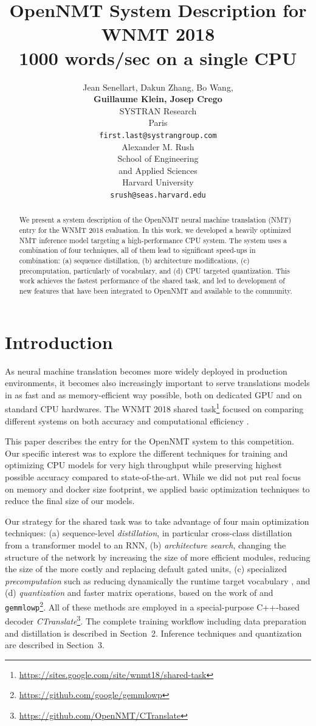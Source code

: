 \documentclass[11pt,a4paper]{article}
\title{OpenNMT System Description for WNMT 2018 \protect\\ 1000 words/sec on a single CPU}
\author{Jean Senellart, Dakun Zhang, Bo Wang,\\{\bf Guillaume Klein, Josep Crego}\\
  SYSTRAN Research\\
  Paris \\
  {\tt first.last@systrangroup.com} \\\And
  Alexander M. Rush\\
  School of Engineering \\
  and Applied Sciences \\
  Harvard University \\
  {\tt srush@seas.harvard.edu} \\}
\date{}
\begin{document}
\maketitle
\begin{abstract}

  We present a system description of the OpenNMT neural machine translation (NMT) entry for the WNMT 2018 evaluation.
  In this work, we developed a heavily optimized NMT inference model
  targeting a high-performance CPU system. The system uses a
  combination of four techniques, all of them lead to significant
  speed-ups in combination: (a) sequence distillation, (b)
  architecture modifications, (c) precomputation, particularly of
  vocabulary, and (d) CPU targeted quantization. This work achieves the fastest performance of the shared task, and led to development of new features that have been integrated to OpenNMT and
  available to the community.

\end{abstract}

\section{Introduction}

As neural machine translation becomes more widely deployed in
production environments, it becomes also increasingly important to serve
translations models in as fast and as memory-efficient way possible,
both on dedicated GPU and on standard CPU hardwares. The
WNMT 2018 shared task\footnote{\url{https://sites.google.com/site/wnmt18/shared-task}}
focused on comparing different systems on both accuracy and
computational efficiency \cite{birch2018wnmt}.

This paper describes the entry for the OpenNMT system to this
competition.  Our specific interest was to explore the different
techniques for training and optimizing CPU models for very high throughput
while preserving highest possible accuracy compared to state-of-the-art. While we did not put real focus
on memory and docker size footprint, we applied basic optimization
techniques to reduce the final size of our models.

Our strategy for the shared task was to take advantage of four main
optimization techniques: (a) sequence-level \textit{distillation}, in
particular cross-class distillation from a transformer model
\cite{vaswani2017attention} to an RNN, (b) \textit{architecture
  search}, changing the structure of the network by increasing the
size of more efficient modules, reducing the size of the more costly
and replacing default gated units,  (c)
specialized \textit{precomputation} such as reducing dynamically the
runtime target vocabulary \cite{shi2017speeding}, and (d) \textit{quantization} and
faster matrix operations, based on the work of
 and {\tt
  gemmlowp}\footnote{\url{https://github.com/google/gemmlowp}}. All of these
methods are employed in a special-purpose C++-based decoder
\textit{CTranslate}\footnote{\url{https://github.com/OpenNMT/CTranslate}}.
The complete training workflow including data preparation and
distillation is described in Section~2. Inference techniques and quantization are
described in Section~3.
\end{document}
